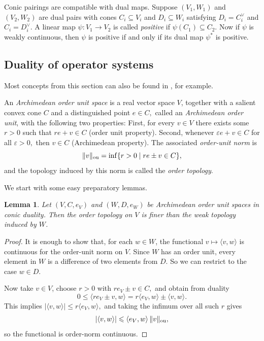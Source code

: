 \documentclass[11pt,onecolumn]{article}
\theoremstyle{plain}
\newtheorem{lemma}[lemma]{Lemma}
\theoremstyle{definition}
\begin{document}
Conic pairings are compatible with dual maps.  Suppose
$(V_1,W_1)$ and $(V_2,W_2)$ are dual pairs with cones
$C_i\subseteq V_i$ and $D_i\subseteq W_i$ satisfying $D_i=C_i^\vee$ and
$C_i=D_i^\vee$.  A linear map $\psi\colon V_1\to V_2$ is called \emph{positive} if
$\psi(C_1)\subseteq C_2$.  Now if $\psi$ is weakly continuous, then $\psi$ is positive if and only if its dual map
$\psi^*$ is positive.

\subsection{Duality of operator systems}

Most concepts from this section can also be found in \cite{Paulsen2002}, for example.

An \emph{Archimedean order unit space} is a real vector space $V$, together with a salient convex cone $C$ and a distinguished point $e\in C,$ called an \emph{Archimedean order unit}, with the following two properties: First, for every $v\in V$ there exists some $r>0$ such that $re+v\in C$ (order unit property). Second, whenever $\varepsilon e+v\in C$ for all $\varepsilon >0,$ then $v\in C$ (Archimedean property).
The associated \emph{order-unit norm} is
\[
    \|v\|_{\rm ou}=\inf\{r>0\mid re\pm v\in C\},
\]
and the topology induced by this norm is called the \emph{order topology}.

We start with some easy preparatory lemmas.

\begin{lemma}
\label{lem:ordertopweak}
    Let $(V,C,e_V)$ and $(W,D,e_W)$ be Archimedean order unit spaces in conic
    duality.  Then the order topology on $V$ is finer than the weak topology
    induced by $W$.
\end{lemma}
\begin{proof}
    It is enough to show that, for each $w\in W$, the functional
    $v\mapsto\langle v,w\rangle$ is continuous for the order-unit norm on
    $V$.
    Since $W$ has an order unit, every element in $W$ is a difference of two elements from $D$. So we can restrict to the case $w\in D$. 
    
    Now take $v\in V$, choose $r>0$ with $re_V\pm v\in C,$ and obtain from duality
    \[
        0\leqslant \langle re_V\pm v,w\rangle
        =r\langle e_V,w\rangle\pm\langle v,w\rangle.
    \]
    This implies $\vert\langle v,w\rangle\vert\leqslant r\langle e_V,w\rangle,$ and taking the infimum over all such $r$ gives
    \[
        |\langle v,w\rangle|
        \leqslant \langle e_V,w\rangle\,\Vert v\Vert_{\rm ou},
    \]
    so the functional is order-norm continuous. 
\end{proof}
\end{document}
